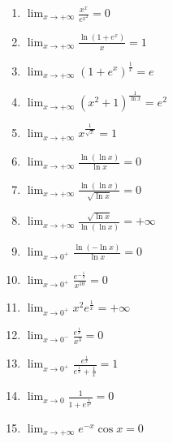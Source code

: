 \documentclass[11pt,a4paper]{article}
\begin{document}
\begin{enumerate}
\item $\displaystyle \lim_{x \to +\infty} \frac{x^{x}}{e^{x^{2}}} = 0$
\item $\displaystyle \lim_{x \to +\infty} \frac{\ln\left(1 + e^{x}\right)}{x} = 1$
\item $\displaystyle \lim_{x \to +\infty} \left(1 + e^{x}\right)^{\frac{1}{x}} = e$
\item $\displaystyle \lim_{x \to +\infty} \left(x^{2} + 1\right)^{\frac{1}{\ln x}} = e^{2}$
\item $\displaystyle \lim_{x \to +\infty} x^{\frac{1}{\sqrt{x}}} = 1$
\item $\displaystyle \lim_{x \to +\infty} \frac{\ln(\ln x)}{\ln x} = 0$
\item $\displaystyle \lim_{x \to +\infty} \frac{\ln(\ln x)}{\sqrt{\ln x}} = 0$
\item $\displaystyle \lim_{x \to +\infty} \frac{\sqrt{\ln x}}{\ln(\ln x)} = +\infty$
\item $\displaystyle \lim_{x \to 0^{+}} \frac{\ln(-\ln x)}{\ln x} = 0$
\item $\displaystyle \lim_{x \to 0^{+}} \frac{e^{-\frac{1}{x}}}{x^{10}} = 0$
\item $\displaystyle \lim_{x \to 0^{+}} x^{2} e^{\frac{1}{x}} = +\infty$
\item $\displaystyle \lim_{x \to 0^{-}} \frac{e^{\frac{1}{x}}}{x^{3}} = 0$
\item $\displaystyle \lim_{x \to 0^{+}} \frac{e^{\frac{1}{x}}}{e^{\frac{1}{x}} + \frac{1}{x}} = 1$
\item $\displaystyle \lim_{x \to 0} \frac{1}{1 + e^{\frac{1}{x^{2}}}} = 0$
\item $\displaystyle \lim_{x \to +\infty} e^{-x}\cos x = 0$
\end{enumerate}
\end{document}
